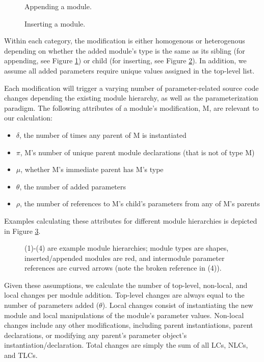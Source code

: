 \begin{figure}
\centering
{}
\caption{Appending a module.}
\label{fig:hc}
\setlength{\belowcaptionskip}{-10pt}
\end{figure}
\begin{figure}
\centering
{}
\caption{Inserting a module.}
\label{fig:vc}
\setlength{\belowcaptionskip}{-20pt}
\end{figure}

Within each category, the modification is either homogenous or heterogenous depending on whether the added module's type is the same as its sibling (for appending, see Figure \ref{fig:hc}) or child (for inserting, see Figure \ref{fig:vc}). In addition, we assume all added parameters require unique values assigned in the top-level list.

Each modification will trigger a varying number of parameter-related source code changes depending the existing module hierarchy, as well as the parameterization paradigm. The following attributes of a module's modification, M, are relevant to our calculation:

\begin{itemize}\itemsep1pt \parskip0pt 
\item $\delta$, the number of times any parent of M is instantiated
\item $\pi$, M's number of unique parent module declarations (that is not of type M)
\item $\mu$, whether M's immediate parent has M's type
\item $\theta$, the number of added parameters
\item $\rho$, the number of references to M's child's parameters from any of M's parents
\end{itemize}

Examples calculating these attributes for different module hierarchies is depicted in Figure \ref{fig:attr}.

\begin{figure}
\centering
{}
\caption{(1)-(4) are example module hierarchies; module types are shapes, inserted/appended modules are red, and intermodule parameter references are curved arrows (note the broken reference in (4)).}
\label{fig:attr}
\setlength{\belowcaptionskip}{-20pt}
\end{figure}

Given these assumptions, we calculate the number of top-level, non-local, and local changes per module addition. Top-level changes are always equal to the number of parameters added ($\theta$). Local changes consist of instantiating the new module and local manipulations of the module's parameter values. Non-local changes include any other modifications, including parent instantiations, parent declarations, or modifying any parent's parameter object's instantiation/declaration. Total changes are simply the sum of all LCs, NLCs, and TLCs.

